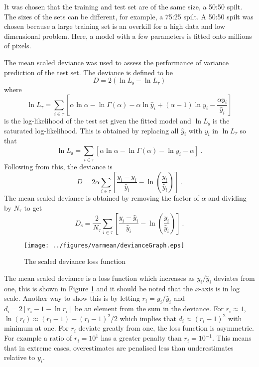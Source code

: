 It was chosen that the training and test set are of the same size, a 50:50 spilt. The sizes of the sets can be different, for example, a 75:25 spilt. A 50:50 spilt was chosen because a large training set is an overkill for a high data and low dimensional problem. Here, a model with a few parameters is fitted onto millions of pixels.

The mean scaled deviance was used to assess the performance of variance prediction of the test set. The deviance is defined to be
\begin{equation}
  D = 2\left(
    \ln L_\mathrm{s} - \ln L_\tau
  \right)
\end{equation}
where
\begin{equation}
\ln L_\tau = \sum_{i\in\tau} \left[
    \alpha\ln\alpha
    -\ln\Gamma(\alpha)
    -\alpha\ln \widehat{y}_i
    +(\alpha-1)\ln y_i
    -\frac{\alpha y_i}{\widehat{y}_i}
  \right]
\end{equation}
is the log-likelihood of the test set given the fitted model and $\ln L_\mathrm{s}$ is the saturated log-likelihood. This is obtained by replacing all $\widehat{y}_i$ with $y_i$ in $\ln L_\tau$ so that
\begin{equation}
  \ln L_\mathrm{s} = \sum_{i\in\tau}\left[
    \alpha\ln\alpha
    -\ln\Gamma(\alpha)
    -\ln y_i
    -\alpha
  \right]
  \ .
\end{equation}
Following from this, the deviance is
\begin{equation}
  D = 2\alpha
  \sum_{i\in\tau}\left[
      \dfrac{
          y_i-\widehat{y}_i
      }
      {
          \widehat{y}_i
      }
      - \ln\left(\dfrac{y_i}{\widehat{y}_i}\right)
  \right]
  \ .
\end{equation}
The mean scaled deviance is obtained by removing the factor of $\alpha$ and dividing by $N_\tau$ to get
\begin{equation}
    D_\mathrm{s} = \dfrac{2}{N_\tau}
    \sum_{i\in\tau}\left[
        \dfrac{
            y_i-\widehat{y}_i
        }
        {
            \widehat{y}_i
        }
        - \ln\left(\dfrac{y_i}{\widehat{y}_i}\right)
    \right]
    \ .
\end{equation}

\begin{figure}
  \centering
  \texttt{[image: ../figures/varmean/devianceGraph.eps]}
  \caption{The scaled deviance loss function}
  \label{fig:meanVar_deviance}
\end{figure}

The mean scaled deviance is a loss function which increases as $y_i/\widehat{y}_i$ deviates from one, this is shown in Figure \ref{fig:meanVar_deviance} and it should be noted that the $x$-axis is in log scale. Another way to show this is by letting $r_i = y_i/\widehat{y}_i$ and $d_i = 2\left[r_i-1-\ln r_i\right]$ be an element from the sum in the deviance. For $r_i\approx 1$, $\ln(r_i)\approx(r_i-1)-(r_i-1)^2/2$ which implies that $d_i\approx (r_i-1)^2$ with minimum at one. For $r_i$ deviate greatly from one, the loss function is asymmetric. For example a ratio of $r_i=10^1$ has a greater penalty than $r_i=10^{-1}$. This means that in extreme cases, overestimates are penalised less than underestimates relative to $y_i$.

